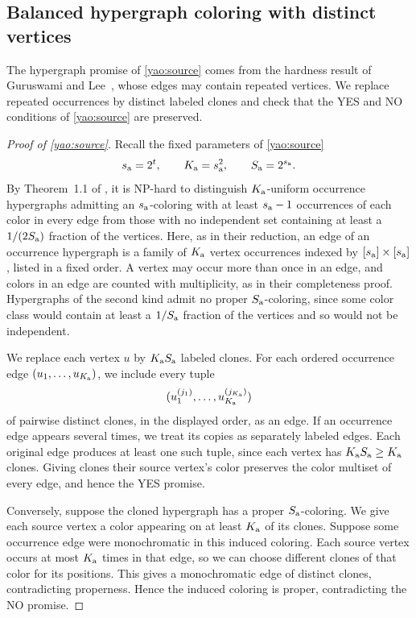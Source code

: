 \documentclass[11pt,letterpaper]{article} \usepackage[utf8]{inputenc}
\theoremstyle{plain} \newtheorem{theorem}{Theorem}[section]
\theoremstyle{definition} \newaliascnt{definition}{theorem}
\begin{document}
\subsection{Balanced hypergraph coloring with distinct vertices}
\label{app:hypergraph-source}

The hypergraph promise of \cref{yao:source} comes from the hardness result of
Guruswami and Lee~\cite{guruswami2018balanced}, whose edges may contain repeated
vertices. We replace repeated occurrences by distinct labeled clones and
check that the YES and NO conditions of \cref{yao:source} are preserved.

\begin{proof}[Proof of \cref{yao:source}]
\label{proof:yao:source}
Recall the fixed parameters of \cref{yao:source}
\[
s_{\rm a}=2^t,\qquad K_{\rm a}=s_{\rm a}^2,\qquad
S_{\rm a}=2^{s_{\rm a}}.
\]
By Theorem~1.1 of \citet{guruswami2018balanced}, it is NP-hard to distinguish
$K_{\rm a}$-uniform occurrence hypergraphs admitting an $s_{\rm a}$-coloring
with at least $s_{\rm a}-1$ occurrences of each color in every edge from those
with no independent set containing at least a $1/(2S_{\rm a})$ fraction of the
vertices. Here, as in their reduction, an edge of an occurrence hypergraph is a
family of $K_{\rm a}$ vertex occurrences indexed by $[s_{\rm a}]\times[s_{\rm a}]$,
listed in a fixed order. A vertex may occur more than once in an edge, and
colors in an edge are counted with multiplicity, as in their completeness
proof. Hypergraphs of the second kind admit no proper $S_{\rm a}$-coloring,
since some color class would contain at least a $1/S_{\rm a}$ fraction of the
vertices and so would not be independent.

We replace each vertex $u$ by $K_{\rm a}S_{\rm a}$ labeled clones. For each
ordered occurrence edge $(u_1,\ldots,u_{K_{\rm a}})$, we include every tuple
\[
(u_1^{(j_1)},\ldots,u_{K_{\rm a}}^{(j_{K_{\rm a}})})
\]
of pairwise distinct clones, in the displayed order, as an edge. If an
occurrence edge appears several times, we treat its copies as separately labeled edges. Each original edge produces at least
one such tuple, since each vertex has $K_{\rm a}S_{\rm a}\ge K_{\rm a}$ clones. Giving clones
their source vertex's color preserves the color multiset of every edge,
and hence the YES promise.

Conversely, suppose the cloned hypergraph has a proper $S_{\rm a}$-coloring.
We give each source vertex a color appearing on at least $K_{\rm a}$ of its
clones. Suppose some occurrence edge were monochromatic in this induced coloring.
Each source vertex occurs at most $K_{\rm a}$ times in that edge, so we can choose
different clones of that color for its positions. This gives a monochromatic
edge of distinct clones, contradicting properness. Hence the induced coloring
is proper, contradicting the NO promise.


\end{proof}
\end{document}

